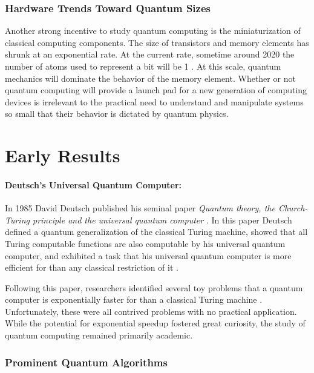 \subsubsection{Hardware Trends Toward Quantum Sizes}

Another strong incentive to study quantum computing is the
miniaturization of classical computing components.  The size of
transistors and memory elements has shrunk at an exponential rate.  At
the current rate, sometime around 2020 the number of atoms used to
represent a bit will be 1 \cite{williams98quantum}.  At this scale,
quantum mechanics will dominate the behavior of the memory element.
Whether or not quantum computing will provide a launch pad for a new
generation of computing devices is irrelevant to the practical need to
understand and manipulate systems so small that their behavior is
dictated by quantum physics.

\section{Early Results}
\label{sec:early}

\paragraph{Deutsch's Universal Quantum Computer:}
In 1985 David Deutsch published his seminal paper
\emph{Quantum theory, the Church-Turing principle and the universal
quantum computer} \cite{deutsch85quantum}.  In this paper Deutsch
defined a quantum generalization of the classical Turing machine,
showed that all Turing computable functions are also computable by his
universal quantum computer, and exhibited a task that his universal
quantum computer is more efficient for than any classical restriction
of it \cite{deutsch85quantum}.

Following this paper, researchers identified several toy problems that
a quantum computer is exponentially faster for than a classical Turing
machine \cite{brassard97exact} \cite{berthiaume92oracle}.
Unfortunately, these were all contrived problems with no practical
application.  While the potential for exponential speedup fostered
great curiosity, the study of quantum computing remained primarily
academic.

\subsubsection{Prominent Quantum Algorithms}

